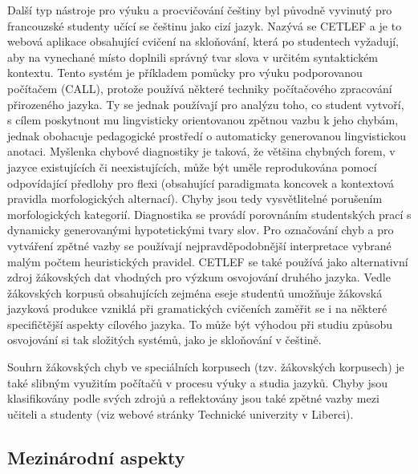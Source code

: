 \documentclass[]{../../metanetpaper}
\begin{document}
\begin{multicols}{2}
Další typ nástroje pro výuku a procvičování češtiny byl původně vyvinutý pro francouzské studenty učící se češtinu jako cizí jazyk. Nazývá se CETLEF\cite{Note9cs} a je to webová aplikace obsahující cvičení na skloňování, která po studentech vyžadují, aby na vynechané místo doplnili správný tvar slova v určitém syntaktickém kontextu. Tento systém je příkladem pomůcky pro výuku podporovanou počítačem (CALL), protože používá některé techniky počítačového zpracování přirozeného jazyka. Ty se jednak používají pro analýzu toho, co student vytvoří, s cílem poskytnout mu lingvisticky orientovanou zpětnou vazbu k jeho chybám, jednak obohacuje pedagogické prostředí o automaticky generovanou lingvistickou anotaci. Myšlenka chybové diagnostiky je taková, že většina chybných forem, v jazyce existujících či neexistujících, může být uměle reprodukována pomocí odpovídající předlohy pro flexi (obsahující paradigmata koncovek a kontextová pravidla morfologických alternací). Chyby jsou tedy vysvětlitelné porušením morfologických kategorií. Diagnostika se provádí porovnáním studentských prací s dynamicky generovanými hypotetickými tvary slov. Pro označování chyb a pro vytváření zpětné vazby se používají nejpravděpodobnější interpretace vybrané malým počtem heuristických pravidel. CETLEF se také používá jako alternativní zdroj žákovských dat vhodných pro výzkum osvojování druhého jazyka. Vedle žákovských korpusů obsahujících zejména eseje studentů umožňuje žákovská jazyková produkce vzniklá při gramatických cvičeních zaměřit se i na některé specifičtější aspekty cílového jazyka. To může být výhodou při studiu způsobu osvojování si tak složitých systémů, jako je skloňování v češtině.

Souhrn žákovských chyb ve speciálních korpusech (tzv. žákovských korpusech) je také slibným využitím počítačů v procesu výuky a studia jazyků. Chyby jsou klasifikovány podle svých zdrojů a reflektovány jsou také zpětné vazby mezi učiteli a studenty (viz webové stránky Technické univerzity v Liberci\cite{Note10}).

\subsection{Mezinárodní aspekty}


\end{multicols}
\end{document}
